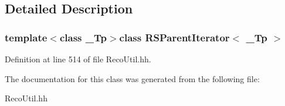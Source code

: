 \subsection{Detailed Description}
\subsubsection*{template$<$class \-\_\-\-Tp$>$class R\-S\-Parent\-Iterator$<$ \-\_\-\-Tp $>$}



Definition at line 514 of file Reco\-Util.\-hh.



The documentation for this class was generated from the following file\-:\begin{DoxyCompactItemize}
\item 
Reco\-Util.\-hh\end{DoxyCompactItemize}
